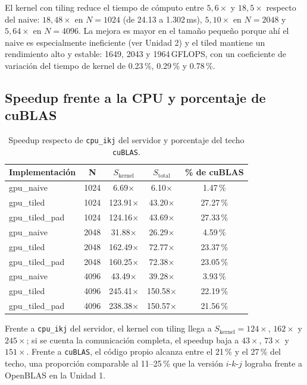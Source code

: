 	El kernel con tiling reduce el tiempo de cómputo entre $5{,}6\times$ y $18{,}5\times$ respecto del naive: $18{,}48\times$ en $N=1024$ (de 24.13 a 1.302\,ms), $5{,}10\times$ en $N=2048$ y $5{,}64\times$ en $N=4096$. La mejora es mayor en el tamaño pequeño porque ahí el naive es especialmente ineficiente (ver Unidad 2) y el tiled mantiene un rendimiento alto y estable: 1649, 2043 y 1964\,GFLOPS, con un coeficiente de variación del tiempo de kernel de 0.23\,\%, 0.29\,\% y 0.78\,\%.

\subsection{Speedup frente a la CPU y porcentaje de cuBLAS}

	\begin{table}[H]
		\centering
		\caption{Speedup respecto de \texttt{cpu\_ikj} del servidor y porcentaje del techo \texttt{cuBLAS}.}
		\begin{tabular}{lcccc}
			\hline
			\textbf{Implementación} & \textbf{N} & \textbf{$S_{\text{kernel}}$} & \textbf{$S_{\text{total}}$} & \textbf{\% de cuBLAS} \bigstrut\\
			\hline
			gpu\_naive & 1024 & 6.69$\times$ & 6.10$\times$ & 1.47\,\% \\
			gpu\_tiled & 1024 & 123.91$\times$ & 43.20$\times$ & 27.27\,\% \\
			gpu\_tiled\_pad & 1024 & 124.16$\times$ & 43.69$\times$ & 27.33\,\% \\
			gpu\_naive & 2048 & 31.88$\times$ & 26.29$\times$ & 4.59\,\% \\
			gpu\_tiled & 2048 & 162.49$\times$ & 72.77$\times$ & 23.37\,\% \\
			gpu\_tiled\_pad & 2048 & 160.25$\times$ & 72.38$\times$ & 23.05\,\% \\
			gpu\_naive & 4096 & 43.49$\times$ & 39.28$\times$ & 3.93\,\% \\
			gpu\_tiled & 4096 & 245.41$\times$ & 150.58$\times$ & 22.19\,\% \\
			gpu\_tiled\_pad & 4096 & 238.38$\times$ & 150.57$\times$ & 21.56\,\% \bigstrut[b]\\
			\hline
		\end{tabular}
		\label{tab:speedup-u3}
	\end{table}

	Frente a \texttt{cpu\_ikj} del servidor, el kernel con tiling llega a $S_{\text{kernel}} = 124\times$, $162\times$ y $245\times$; si se cuenta la comunicación completa, el speedup baja a $43\times$, $73\times$ y $151\times$. Frente a \texttt{cuBLAS}, el código propio alcanza entre el 21\,\% y el 27\,\% del techo, una proporción comparable al 11--25\,\% que la versión $i\text{-}k\text{-}j$ lograba frente a OpenBLAS en la Unidad 1.

